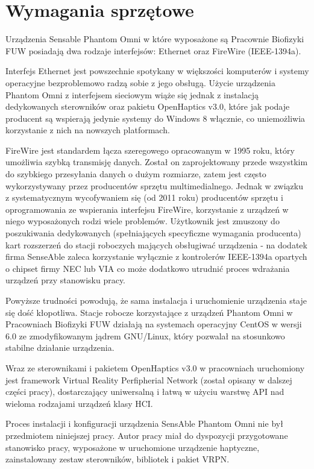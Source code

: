 \documentclass[licencjacka]{pracamgr}
\begin{document}
\section{Wymagania sprzętowe}

	Urządzenia Sensable Phantom Omni w które wyposażone są Pracownie Biofizyki FUW posiadają dwa rodzaje interfejsów: Ethernet oraz FireWire (IEEE-1394a). 

Interfejs Ethernet jest powszechnie spotykany w większości komputerów i systemy operacyjne bezproblemowo radzą sobie z jego obsługą. Użycie urządzenia Phantom Omni z interfejsem sieciowym wiąże się jednak z instalacją dedykowanych sterowników oraz pakietu OpenHaptics v3.0, które jak podaje producent są wspierają jedynie systemy do Windows 8 włącznie, co uniemożliwia korzystanie z nich na nowszych platformach.

FireWire jest standardem łącza szeregowego opracowanym w 1995 roku, który umożliwia szybką transmisję danych. Został on zaprojektowany przede wszystkim do szybkiego przesyłania danych o dużym rozmiarze, zatem jest często wykorzystywany przez producentów sprzętu multimedialnego. Jednak w związku z systematycznym wycofywaniem się (od 2011 roku) producentów sprzętu i oprogramowania ze wspierania interfejsu FireWire, korzystanie z urządzeń w niego wyposażonych rodzi wiele problemów. Użytkownik jest zmuszony do poszukiwania dedykowanych (spełniających specyficzne wymagania producenta) kart rozszerzeń do stacji roboczych mających obsługiwać urządzenia - na dodatek firma SenseAble zaleca korzystanie wyłącznie z kontrolerów IEEE-1394a opartych o chipset firmy NEC lub VIA co może dodatkowo utrudnić proces wdrażania urządzeń przy stanowisku pracy.

Powyższe trudności powodują, że sama instalacja i uruchomienie urządzenia staje się dość kłopotliwa. Stacje robocze korzystające z urządzeń Phantom Omni w Pracowniach Biofizyki FUW działają na systemach operacyjny CentOS w wersji 6.0 ze zmodyfikowanym jądrem GNU/Linux, który pozwalał na stosunkowo stabilne działanie urządzenia. 

Wraz ze sterownikami i pakietem OpenHaptics v3.0 w pracowniach uruchomiony jest framework Virtual Reality Perfipherial Network (został opisany w dalszej części pracy), dostarczający uniwersalną i łatwą w użyciu warstwę API nad wieloma rodzajami urządzeń klasy HCI. 

Proces instalacji i konfiguracji urządzenia SensAble Phantom Omni nie był przedmiotem niniejszej pracy. Autor pracy miał do dyspozycji przygotowane stanowisko pracy, wyposażone w uruchomione urządzenie haptyczne, zainstalowany zestaw sterowników, bibliotek i pakiet VRPN.
\end{document}
